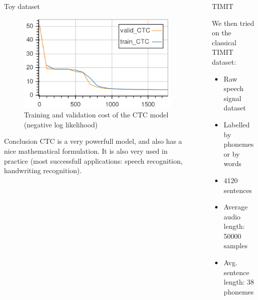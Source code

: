 \documentclass[final]{beamer}
\newlength{\sepwid}
\newlength{\onecolwid}
\newlength{\twocolwid}
\begin{document}
\begin{frame}[t]
\begin{columns}[t]
\begin{column}{\twocolwid}
\begin{columns}[t,totalwidth=\twocolwid]
\begin{column}{\onecolwid}
\begin{block}{Toy dataset}
\begin{figure}
\includegraphics[width=\linewidth]{ctc_cost_best.png}
\caption{Training and validation cost of the CTC model (negative log likelihood)}
\end{figure}
\end{block}

\begin{block}{Conclusion}
CTC is a very powerfull model, and also has a nice mathematical formulation. It is also very used in practice (most successfull applications: speech recognition, handwriting recognition).
\end{block}




\end{column} %

\begin{column}{\sepwid}\end{column} %


\begin{column}{\onecolwid} %

\begin{block}{TIMIT}

We then tried on the classical TIMIT dataset:

\begin{itemize}
\item Raw speech signal dataset
\item Labelled by phonemes or by words
\item 4120 sentences
\item Average audio length: 50000 samples
\item Avg. sentence length: 38 phonemes
\end{itemize}


\end{block}
\end{column}
\end{columns}
\end{column}
\end{columns}
\end{frame}
\end{document}
